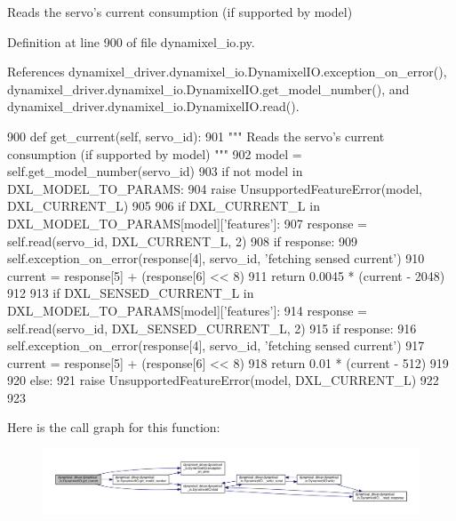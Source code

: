 \begin{DoxyVerb}Reads the servo's current consumption (if supported by model) \end{DoxyVerb}
 

Definition at line 900 of file dynamixel\+\_\+io.\+py.



References dynamixel\+\_\+driver.\+dynamixel\+\_\+io.\+Dynamixel\+I\+O.\+exception\+\_\+on\+\_\+error(), dynamixel\+\_\+driver.\+dynamixel\+\_\+io.\+Dynamixel\+I\+O.\+get\+\_\+model\+\_\+number(), and dynamixel\+\_\+driver.\+dynamixel\+\_\+io.\+Dynamixel\+I\+O.\+read().


\begin{DoxyCode}
900     \textcolor{keyword}{def }get\_current(self, servo\_id):
901         \textcolor{stringliteral}{""" Reads the servo's current consumption (if supported by model) """}
902         model = self.get\_model\_number(servo\_id)
903         \textcolor{keywordflow}{if} \textcolor{keywordflow}{not} model \textcolor{keywordflow}{in} DXL\_MODEL\_TO\_PARAMS:
904             \textcolor{keywordflow}{raise} UnsupportedFeatureError(model, DXL\_CURRENT\_L)
905 
906         \textcolor{keywordflow}{if} DXL\_CURRENT\_L \textcolor{keywordflow}{in} DXL\_MODEL\_TO\_PARAMS[model][\textcolor{stringliteral}{'features'}]:
907             response = self.read(servo\_id, DXL\_CURRENT\_L, 2)
908             \textcolor{keywordflow}{if} response:
909                 self.exception\_on\_error(response[4], servo\_id, \textcolor{stringliteral}{'fetching sensed current'})
910             current = response[5] + (response[6] << 8)
911             \textcolor{keywordflow}{return} 0.0045 * (current - 2048)
912 
913         \textcolor{keywordflow}{if} DXL\_SENSED\_CURRENT\_L \textcolor{keywordflow}{in} DXL\_MODEL\_TO\_PARAMS[model][\textcolor{stringliteral}{'features'}]:
914             response = self.read(servo\_id, DXL\_SENSED\_CURRENT\_L, 2)
915             \textcolor{keywordflow}{if} response:
916                 self.exception\_on\_error(response[4], servo\_id, \textcolor{stringliteral}{'fetching sensed current'})
917             current = response[5] + (response[6] << 8)
918             \textcolor{keywordflow}{return} 0.01 * (current - 512)
919 
920         \textcolor{keywordflow}{else}:
921             \textcolor{keywordflow}{raise} UnsupportedFeatureError(model, DXL\_CURRENT\_L)
922 
923 
\end{DoxyCode}
Here is the call graph for this function\+:
\nopagebreak
\begin{figure}[H]
\begin{center}
\leavevmode
\includegraphics[width=350pt]{dd/d77/classdynamixel__driver_1_1dynamixel__io_1_1_dynamixel_i_o_aac11f861a1d7b67bb5976a43ea69b092_cgraph}
\end{center}
\end{figure}
